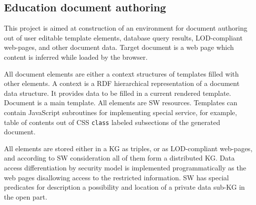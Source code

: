 \documentclass[
]{ceurart}
\begin{document}
\subsection{Education document authoring}
\label{sec:doc-impl}

This project \cite{authoring} is aimed at construction of an environment for document authoring out of user editable template elements, database query results, LOD-compliant web-pages, and other document data.  Target document is a web page which content is inferred while loaded by the browser.

All document elements are either a context structures of templates filled with other elements.  A context is a RDF hierarchical representation of a document data structure.  It provides data to be filled in a current rendered template.  Document is a main template.  All elements are SW resources.  Templates can contain JavaScript subroutines for implementing special service, for example, table of contents out of CSS \verb|class| labeled subsections of the generated document.

All elements are stored either in a KG as triples, or as LOD-compliant web-pages, and according to SW consideration all of them form a distributed KG.  Data access differentiation by security model is implemented programmatically as the web pages disallowing access to the restricted information.  SW has special predicates for description a possibility and location of a private data sub-KG in the open part.
\end{document}
